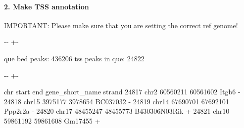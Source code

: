 \documentclass[letterpaper,10pt,english]{sphinxmanual}
\newlength\nbsphinxcodecellspacing
\begin{document}
\paragraph{2. Make TSS annotation}
\label{\detokenize{notebooks/01_ATAC-seq_data_processing/option2_Bulk_ATAC-seq_data/01_preprocess_Bulk_ATAC_seq_peak_data:2.-Make-TSS-annotation}}
IMPORTANT: Please make sure that you are setting the correct ref genome!

{
\begin{sphinxVerbatim}[commandchars=\\\{\}]
\llap{\color{nbsphinxin}[7]:\,\hspace{\fboxrule}\hspace{\fboxsep}}   

\end{sphinxVerbatim}
}

{

\kern-\sphinxverbatimsmallskipamount\kern-\baselineskip
\kern+\FrameHeightAdjust\kern-\fboxrule
\vspace{\nbsphinxcodecellspacing}

\begin{sphinxVerbatim}[commandchars=\\\{\}]
que bed peaks: 436206
tss peaks in que: 24822
\end{sphinxVerbatim}
}

{

\kern-\sphinxverbatimsmallskipamount\kern-\baselineskip
\kern+\FrameHeightAdjust\kern-\fboxrule
\vspace{\nbsphinxcodecellspacing}

\begin{sphinxVerbatim}[commandchars=\\\{\}]
\llap{\color{nbsphinxout}[7]:\,\hspace{\fboxrule}\hspace{\fboxsep}}         chr     start       end gene\_short\_name strand
24817   chr2  60560211  60561602           Itgb6      -
24818  chr15   3975177   3978654        BC037032      -
24819  chr14  67690701  67692101         Ppp2r2a      -
24820  chr17  48455247  48455773   B430306N03Rik      +
24821  chr10  59861192  59861608         Gm17455      +
\end{sphinxVerbatim}
}
\end{document}
